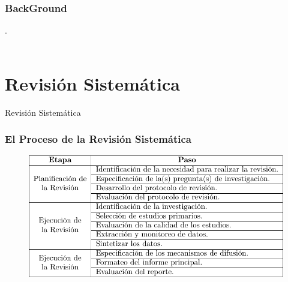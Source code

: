 \documentclass{beamer}
\begin{document}
\begin{frame}
	\frametitle{BackGround}
	.\\~\\
\end{frame}

\section{Revisión Sistemática} %

\begin{frame}
\Huge{\centerline{Revisión Sistemática}}
\end{frame}

\begin{frame}
	\frametitle{El Proceso de la Revisión Sistemática}	
	\begin{figure}[H]
		\begin{center}
			\includegraphics[scale=0.4]{images/1document/steps.png}
			\label{Pasos}
		\end{center}
	\end{figure}
\end{frame}
\end{document}
